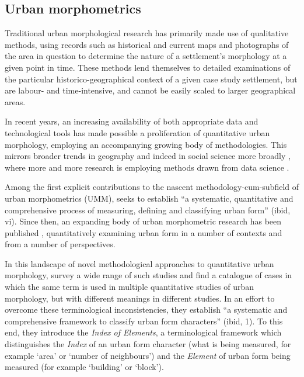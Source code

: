 \documentclass[a4paper, nobind]{templates/ociamthesis}
\begin{document}
\hypertarget{urban-morphometrics}{%
\subsection{Urban morphometrics}\label{urban-morphometrics}}

Traditional urban morphological research has primarily made use of qualitative methods, using records such as historical and current maps and photographs of the area in question to determine the nature of a settlement's morphology at a given point in time. These methods lend themselves to detailed examinations of the particular historico-geographical context of a given case study settlement, but are labour- and time-intensive, and cannot be easily scaled to larger geographical areas.

In recent years, an increasing availability of both appropriate data and technological tools has made possible a proliferation of quantitative urban morphology, employing an accompanying growing body of methodologies. This mirrors broader trends in geography \citep{arribas-bel2014, wolf2019, singleton2021} and indeed in social science more broadly \citep{lazer2017}, where more and more research is employing methods drawn from data science \citep[and the methodological traditions that precede the term; see][]{donoho2017}.

Among the first explicit contributions to the nascent methodology-cum-subfield of urban morphometrics (UMM), \citet{dibble2016} seeks to establish ``a systematic, quantitative and comprehensive process of measuring, defining and classifying urban form'' (ibid, vi). Since then, an expanding body of urban morphometric research has been published \citep{dibble2019, araldi2019, bobkova2021}, quantitatively examining urban form in a number of contexts and from a number of perspectives.

In this landscape of novel methodological approaches to quantitative urban morphology, \citet{fleischmann2020measuring} survey a wide range of such studies and find a catalogue of cases in which the same term is used in multiple quantitative studies of urban morphology, but with different meanings in different studies. In an effort to overcome these terminological inconsistencies, they establish ``a systematic and comprehensive framework to classify urban form characters'' (ibid, 1). To this end, they introduce the \emph{Index of Elements}, a terminological framework which distinguishes the \emph{Index} of an urban form character (what is being measured, for example `area' or `number of neighbours') and the \emph{Element} of urban form being measured (for example `building' or `block').
\end{document}
